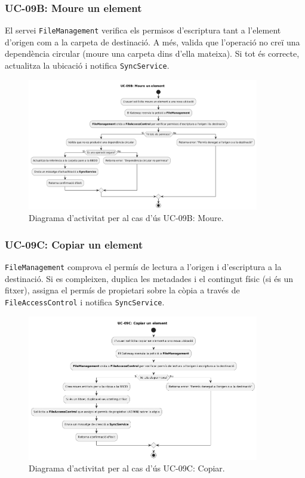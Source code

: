 \subsubsection{UC-09B: Moure un element}
El servei \texttt{FileManagement} verifica els permisos d'escriptura tant a l'element d'origen com a la carpeta de destinació. A més, valida que l'operació no creï una dependència circular (moure una carpeta dins d'ella mateixa). Si tot és correcte, actualitza la ubicació i notifica \texttt{SyncService}.

\begin{figure}[H]
    \centering
    \includegraphics[width=0.9\textwidth]{Figures/ad_UC09B.png}
    \caption{Diagrama d'activitat per al cas d'ús UC-09B: Moure.}
    \label{fig:ad_uc09b_app}
\end{figure}

\subsubsection{UC-09C: Copiar un element}
\texttt{FileManagement} comprova el permís de lectura a l'origen i d'escriptura a la destinació. Si es compleixen, duplica les metadades i el contingut físic (si és un fitxer), assigna el permís de propietari sobre la còpia a través de \texttt{FileAccessControl} i notifica \texttt{SyncService}.

\begin{figure}[H]
    \centering
    \includegraphics[width=0.9\textwidth]{Figures/ad_UC09C.png}
    \caption{Diagrama d'activitat per al cas d'ús UC-09C: Copiar.}
    \label{fig:ad_uc09c_app}
\end{figure}

